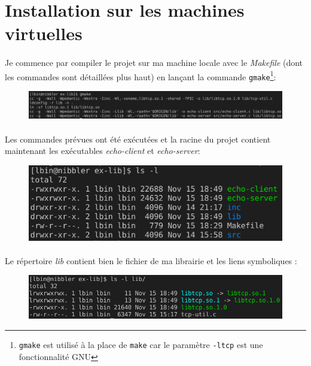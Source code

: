 \documentclass{article}
\begin{document}
    \newpage
    \section{Installation sur les machines virtuelles}
    \paragraph{}
    Je commence par compiler le projet sur ma machine locale avec le \emph{Makefile} (dont les commandes sont détaillées plus haut) en lançant la commande \texttt{gmake}\footnote{\texttt{gmake} est utilisé à la place de \texttt{make} car le paramètre \texttt{-ltcp} est une fonctionnalité GNU}:
    \begin{figure}[H]
        \centering
        \includegraphics[width=\linewidth]{./screenshots/compilation-projet.png}
    \end{figure}

    \paragraph{}
    Les commandes prévues ont été exécutées et la racine du projet contient maintenant les exécutables \emph{echo-client} et \emph{echo-server}:
    \begin{figure}[H]
        \centering
        \includegraphics[width=.5\linewidth]{./screenshots/compilation-projet-exec-files.png}
    \end{figure}
    
    \paragraph{}
    Le répertoire \emph{lib} contient bien le fichier de ma librairie et les liens symboliques :
    \begin{figure}[H]
        \centering
        \includegraphics[width=.65\linewidth]{./screenshots/compilation-projet-lib-files.png}
    \end{figure}
\end{document}
